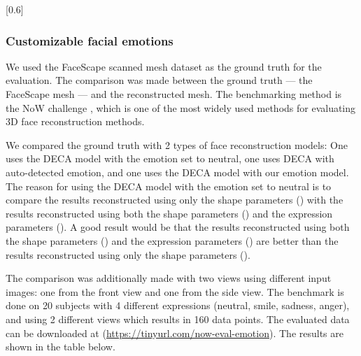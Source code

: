 [0.6]

\subsubsection{Customizable facial emotions}

We used the FaceScape scanned mesh dataset as the ground truth for the evaluation. The comparison was made between the ground truth --- the FaceScape mesh --- and the reconstructed mesh. The benchmarking method is the NoW challenge \cite{RingNet:CVPR:2019}, which is one of the most widely used methods for evaluating 3D face reconstruction methods.

We compared the ground truth with 2 types of face reconstruction models: One uses the DECA model with the emotion set to neutral, one uses DECA with auto-detected emotion, and one uses the DECA model with our emotion model. The reason for using the DECA model with the emotion set to neutral is to compare the results reconstructed using only the shape parameters (\beta) with the results reconstructed using both the shape parameters (\beta) and the expression parameters (\psi). A good result would be that the results reconstructed using both the shape parameters (\beta) and the expression parameters (\psi) are better than the results reconstructed using only the shape parameters (\beta).

The comparison was additionally made with two views using different input images: one from the front view and one from the side view. The benchmark is done on 20 subjects with 4 different expressions (neutral, smile, sadness, anger), and using 2 different views which results in 160 data points. The evaluated data can be downloaded at (\url{https://tinyurl.com/now-eval-emotion}). The results are shown in the table below.

